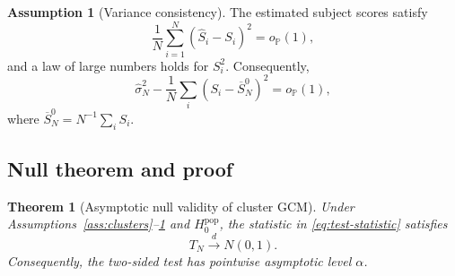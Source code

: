 \documentclass[11pt]{article}
\newtheorem{theorem}{Theorem}[section]
\theoremstyle{definition}
\newtheorem{assumption}{Assumption}[section]
\newcommand{\op}{o_{\mathbb{P}}}
\begin{document}
\begin{assumption}[Variance consistency]
\label{ass:variance}
The estimated subject scores satisfy
\[
\frac1N\sum_{i=1}^N(\widehat S_i-S_i)^2=\op(1),
\]
and a law of large numbers holds for $S_i^2$. Consequently,
\[
\widehat\sigma_N^2-\frac1N\sum_i(S_i-\overline S_N^0)^2=\op(1),
\]
where $\overline S_N^0=N^{-1}\sum_iS_i$.
\end{assumption}

\subsection{Null theorem and proof}

\begin{theorem}[Asymptotic null validity of cluster GCM]
\label{thm:null}
Under Assumptions~\ref{ass:clusters}--\ref{ass:variance} and
$H_0^{\mathrm{pop}}$, the statistic in
\eqref{eq:test-statistic} satisfies
\[
T_N\xrightarrow{d}N(0,1).
\]
Consequently, the two-sided test has pointwise asymptotic level $\alpha$.
\end{theorem}
\end{document}
